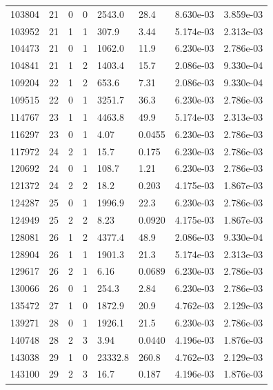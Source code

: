 \documentclass[preview]{standalone}
\begin{document}
{{{\begin{tabular}{L{1.2cm}C{1.2cm} C{0.3cm}C{0.5cm} C{1.4cm}C{1.4cm} C{1.4cm}C{1.4cm}}
  103804  &    21  & 0     &  0 &  2543.0  & 28.4  & 8.630e-03 &  3.859e-03   \\ 
  103952  &    21  & 1     &  1 &  307.9  & 3.44  & 5.174e-03 &  2.313e-03   \\ 
  104473  &    21  & 0     &  1 &  1062.0  & 11.9  & 6.230e-03 &  2.786e-03   \\ 
  104841  &    21  & 1     &  2 &  1403.4  & 15.7  & 2.086e-03 &  9.330e-04   \\ 
  109204  &    22  & 1     &  2 &  653.6  & 7.31  & 2.086e-03 &  9.330e-04   \\ 
  109515  &    22  & 0     &  1 &  3251.7  & 36.3  & 6.230e-03 &  2.786e-03   \\ 
  114767  &    23  & 1     &  1 &  4463.8  & 49.9  & 5.174e-03 &  2.313e-03   \\ 
  116297  &    23  & 0     &  1 &  4.07  & 0.0455  & 6.230e-03 &  2.786e-03   \\ 
  117972  &    24  & 2     &  1 &  15.7  & 0.175  & 6.230e-03 &  2.786e-03   \\ 
  120692  &    24  & 0     &  1 &  108.7  & 1.21  & 6.230e-03 &  2.786e-03   \\ 
  121372  &    24  & 2     &  2 &  18.2  & 0.203  & 4.175e-03 &  1.867e-03   \\ 
  124287  &    25  & 0     &  1 &  1996.9  & 22.3  & 6.230e-03 &  2.786e-03   \\ 
  124949  &    25  & 2     &  2 &  8.23  & 0.0920  & 4.175e-03 &  1.867e-03   \\ 
  128081  &    26  & 1     &  2 &  4377.4  & 48.9  & 2.086e-03 &  9.330e-04   \\ 
  128904  &    26  & 1     &  1 &  1901.3  & 21.3  & 5.174e-03 &  2.313e-03   \\ 
  129617  &    26  & 2     &  1 &  6.16  & 0.0689  & 6.230e-03 &  2.786e-03   \\ 
  130066  &    26  & 0     &  1 &  254.3  & 2.84  & 6.230e-03 &  2.786e-03   \\ 
  135472  &    27  & 1     &  0 &  1872.9  & 20.9  & 4.762e-03 &  2.129e-03   \\ 
  139271  &    28  & 0     &  1 &  1926.1  & 21.5  & 6.230e-03 &  2.786e-03   \\ 
  140748  &    28  & 2     &  3 &  3.94  & 0.0440  & 4.196e-03 &  1.876e-03   \\ 
  143038  &    29  & 1     &  0 &  23332.8  & 260.8  & 4.762e-03 &  2.129e-03   \\ 
  143100  &    29  & 2     &  3 &  16.7  & 0.187  & 4.196e-03 &  1.876e-03   \\ 

\end{tabular}}}}
\end{document}
